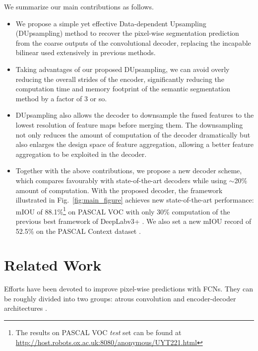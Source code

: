 \documentclass[10pt,twocolumn,letterpaper]{article}
\newcommand{\1}{{\mathbbm{1}}}
\begin{document}
We summarize our main contributions as follows.
\begin{itemize}
\itemsep -.05112cm
    \item We propose a simple yet effective Data-dependent Upsampling (DUpsampling) method to recover the pixel-wise segmentation prediction from the coarse outputs of the convolutional decoder,
replacing the incapable bilinear used extensively in previous methods.
    \item Taking advantages of our proposed DUpsampling, we can avoid overly reducing the overall strides of the encoder, significantly reducing the computation time and memory footprint of
    the semantic segmentation method  by a factor of 3 or so.
    \item DUpsampling also allows the decoder to downsample the fused features to the lowest resolution of feature maps before merging them. The downsampling not only reduces the amount of computation of the decoder dramatically but also enlarges the design space of feature aggregation, allowing a better feature aggregation to be exploited in the decoder.
    \item Together with the above contributions, we propose a new decoder scheme, which compares favourably with state-of-the-art decoders while using $\sim$20\% amount of computation. With the proposed decoder, the framework illustrated in Fig.~\ref{fig:main_figure} achieves new state-of-the-art performance: mIOU of 88.1\%\footnote{The results on PASCAL VOC {\it test} set can be found at \url{http://host.robots.ox.ac.uk:8080/anonymous/UYT221.html}
    } on PASCAL VOC \cite{everingham2010pascal} with only  30\% computation of the previous best
    framework of DeepLabv3+ \cite{chen2018encoder}.
We also set a new mIOU record of 52.5\% on the PASCAL Context dataset
    \cite{mottaghi2014role}.
\end{itemize}

\section{Related Work}

Efforts have been devoted  to improve  pixel-wise predictions with FCNs. They can be roughly divided into two groups:
atrous convolution \cite{chen2018deeplab, yu2015multi} and encoder-decoder architectures \cite{lin2017refinenet, chen2018encoder, long2015fully, badrinarayanan2017segnet, noh2015learning}.
\end{document}

